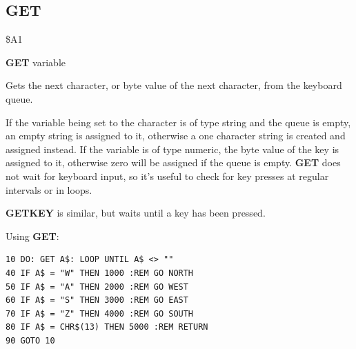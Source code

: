 \subsection{GET}
\begin{description}[leftmargin=2cm,style=nextline]
\item [Token:] \$A1
\item [Format:] {\bf GET} variable
\item [Usage:] Gets the next character, or byte value of the next character,
               from the keyboard queue.

               If the variable being set to the character is of type string and the queue is empty,
               an empty string is assigned to it,
               otherwise a one character string is created
               and assigned instead.
               If the variable is of type numeric, the byte value
               of the key is assigned to it, otherwise zero will be assigned if the queue is empty.
               {\bf GET} does not wait for keyboard
               input, so it's useful to check for key presses
               at regular intervals or in loops.

\item [Remarks:] {\bf GETKEY} is similar, but waits
                 until a key has been pressed.

\item [Example:] Using {\bf GET}:
\begin{tcolorbox}[colback=black,coltext=white]
\verbatimfont{\codefont}
\begin{verbatim}
10 DO: GET A$: LOOP UNTIL A$ <> ""
40 IF A$ = "W" THEN 1000 :REM GO NORTH
50 IF A$ = "A" THEN 2000 :REM GO WEST
60 IF A$ = "S" THEN 3000 :REM GO EAST
70 IF A$ = "Z" THEN 4000 :REM GO SOUTH
80 IF A$ = CHR$(13) THEN 5000 :REM RETURN
90 GOTO 10
\end{verbatim}
\end{tcolorbox}
\end{description}


\newpage
